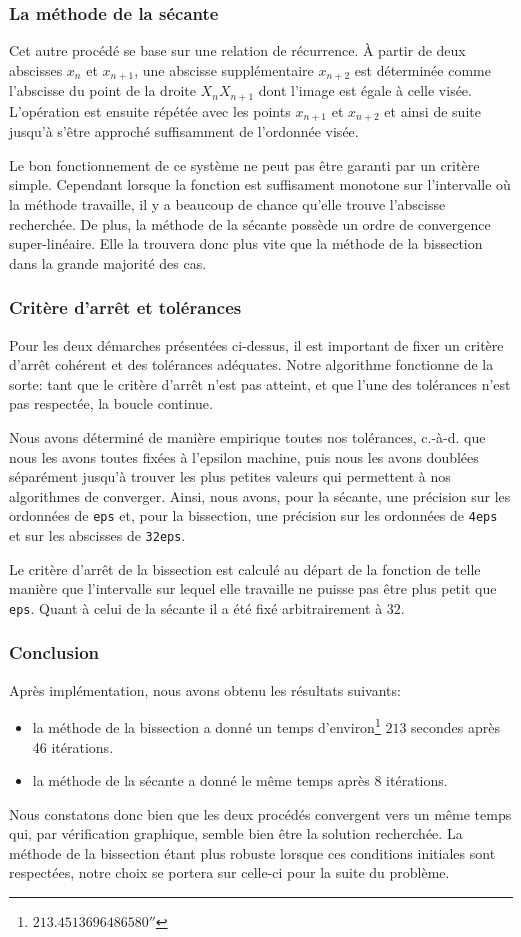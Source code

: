 \documentclass[a4paper, 12pt]{article}
\begin{document}
	\subsubsection{La méthode de la sécante}
	Cet autre procédé se base sur une relation de récurrence. \`{A} partir de deux abscisses $x_{n}$ et $x_{n + 1}$, une abscisse supplémentaire $x_{n + 2}$ est déterminée comme l'abscisse du point de la droite $X_{n}X_{n + 1}$ dont l'image est égale à celle visée. L'opération est ensuite répétée avec les points $x_{n + 1}$ et $x_{n + 2}$ et ainsi de suite jusqu'à s'être approché suffisamment de l'ordonnée visée.\par
	Le bon fonctionnement de ce système ne peut pas être garanti par un critère simple. Cependant lorsque la fonction est suffisament monotone sur l'intervalle où la méthode travaille, il y a beaucoup de chance 
	qu'elle trouve l'abscisse recherchée. De plus, la méthode de la sécante possède un ordre de convergence super-linéaire. Elle la trouvera donc plus vite que la méthode de la bissection dans la grande majorité des cas.
	\subsubsection{Critère d'arrêt et tolérances}
	Pour les deux démarches présentées ci-dessus, il est important de fixer un critère d'arrêt cohérent et des tolérances adéquates. Notre algorithme fonctionne de la sorte: tant que le critère d'arrêt n'est pas atteint, et que l'une des tolérances n'est pas respectée, la boucle continue.\par
	Nous avons déterminé de manière empirique toutes nos tolérances, c.-à-d. que nous les avons toutes fixées à l'epsilon machine, puis nous les avons doublées séparément jusqu'à trouver les plus petites valeurs qui permettent à nos algorithmes de converger. Ainsi, nous avons, pour la sécante, une précision sur les ordonnées de \texttt{eps} et, pour la bissection, une précision sur les ordonnées de \texttt{4eps} et sur les abscisses de \texttt{32eps}.\par
	Le critère d'arrêt de la bissection est calculé au départ de la fonction de telle manière que l'intervalle sur lequel elle travaille ne puisse pas être plus petit que \texttt{eps}. Quant à celui de la sécante il a été fixé arbitrairement à $\num{32}$.
	\subsubsection{Conclusion}
	Après implémentation, nous avons obtenu les résultats suivants:
	\begin{itemize}
		\item la méthode de la bissection a donné un temps d'environ\footnote{$\unit{\num{213.4513696486580}}{\second}$} $\num{213}$ secondes après 46 itérations.
		\item la méthode de la sécante a donné le même temps après 8 itérations.
	\end{itemize}
	Nous constatons donc bien que les deux procédés convergent vers un même temps qui, par vérification graphique, semble bien être la solution recherchée. La méthode de la bissection étant plus robuste lorsque ces conditions initiales sont respectées, notre choix se portera sur celle-ci pour la suite du problème.
\end{document}
